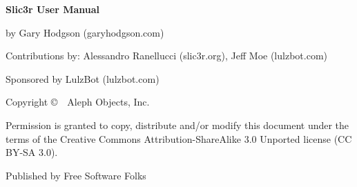 \clearpage\null\vfill
\begingroup 
\thispagestyle{empty}
\footnotesize\raggedright
\setlength{\parskip}{0.5\baselineskip}

\textbf{Slic3r User Manual}

by Gary Hodgson (garyhodgson.com)

Contributions by: Alessandro Ranellucci (slic3r.org), Jeff Moe (lulzbot.com)

Sponsored by LulzBot (lulzbot.com)

Copyright \copyright\ \the\year\ Aleph Objects, Inc.\par
Permission is granted to copy, distribute and\slash or modify 
this document under the terms of the
Creative Commons Attribution-ShareAlike 3.0 Unported license
(CC BY-SA 3.0).

Published by Free Software Folks

\hfill\texttt{\the\year\the\month\the\day}
\endgroup
\pagebreak{}
